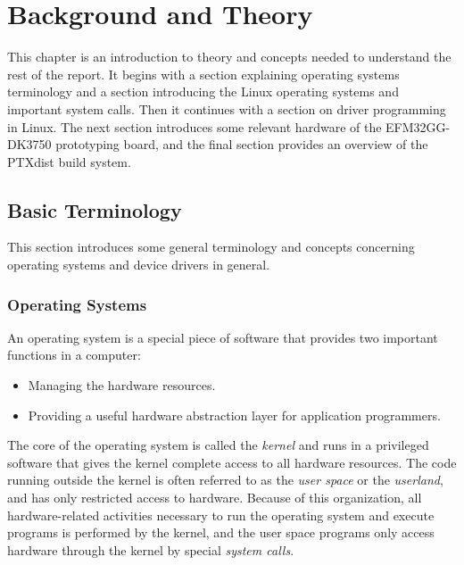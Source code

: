 \chapter{Background and Theory}

This chapter is an introduction to theory and concepts needed to understand the rest of the report. It begins with a section explaining operating systems terminology and a section introducing the Linux operating systems and important system calls. Then it continues with a section on driver programming in Linux. The next section introduces some relevant hardware of the EFM32GG-DK3750 prototyping board, and the final section provides an overview of the PTXdist build system.


\section{Basic Terminology}\label{basic-terminology}
This section introduces some general terminology and concepts concerning operating systems and device drivers in general.

\subsection{Operating Systems}
An operating system is a special piece of software that provides two important functions in a computer:
\begin{itemize}
  \item Managing the hardware resources.
  \item Providing a useful hardware abstraction layer for application programmers.
\end{itemize}
The core of the operating system is called the \emph{kernel} and runs in a privileged software that gives the kernel complete access to all hardware resources. The code running outside the kernel is often referred to as the \emph{user space} or the \emph{userland}, and has only restricted access to hardware. Because of this organization, all hardware-related activities necessary to run the operating system and execute programs is performed by the kernel, and the user space programs only access hardware through the kernel by special \emph{system calls}.
\cite{modern-operating-systems}


